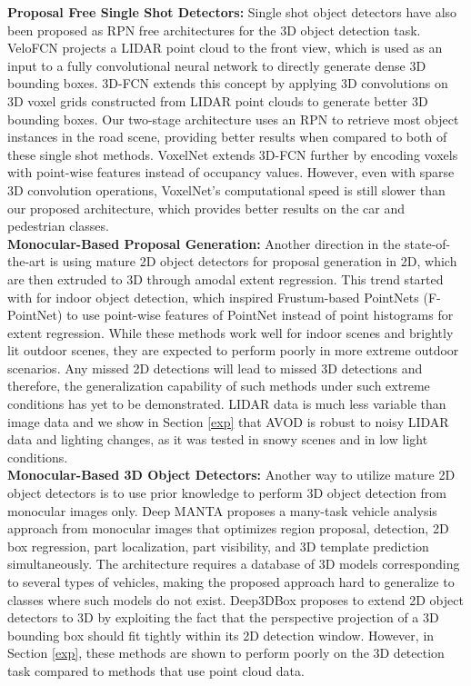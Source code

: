 \documentclass[letterpaper, 10 pt, conference]{ieeeconf}
\begin{document}
\noindent \textbf{Proposal Free Single Shot Detectors:}
Single shot object detectors have also been proposed as RPN free architectures for the 3D object detection task. VeloFCN \cite{Li-RSS-16} projects a LIDAR point cloud to the front view, which is used as an input to a fully convolutional neural network to directly generate dense 3D bounding boxes. 3D-FCN \cite{li20163d} extends this concept by applying 3D convolutions on 3D voxel grids constructed from LIDAR point clouds to generate better 3D bounding boxes. Our two-stage architecture uses an RPN to retrieve most object instances in the road scene, providing better results when compared to both of these single shot methods. VoxelNet \cite{zhou2017voxelnet} extends 3D-FCN further by encoding voxels with point-wise features instead of occupancy values. However, even with sparse 3D convolution operations, VoxelNet's computational speed is still  slower than our proposed architecture, which provides better results on the car and pedestrian classes.\\

\noindent \textbf{Monocular-Based Proposal Generation:}
Another direction in the state-of-the-art is using mature 2D object detectors for proposal generation in 2D, which are then extruded to 3D through amodal extent regression. This trend started with \cite{lahoud20172d} for indoor object detection, which inspired Frustum-based PointNets (F-PointNet) \cite{qi2017frustum} to use point-wise features of PointNet \cite{qi2016pointnet} instead of point histograms for extent regression. While these methods work well for indoor scenes and brightly lit outdoor scenes, they are expected to perform poorly in more extreme outdoor scenarios. Any missed 2D detections will lead to missed 3D detections and therefore, the generalization capability of such methods under such extreme conditions has yet to be demonstrated. LIDAR data is much less variable than image data and we show in Section \ref{exp} that AVOD is robust to noisy LIDAR data and lighting changes, as it was tested in snowy scenes and in low light conditions.\\

\noindent \textbf{Monocular-Based 3D Object Detectors:}
Another way to utilize mature 2D object detectors is to use prior knowledge to perform 3D object detection from monocular images only. Deep MANTA \cite{chabot2017deep} proposes a many-task vehicle analysis approach from monocular images that optimizes region proposal, detection, 2D box regression, part localization, part visibility, and 3D template prediction simultaneously. The architecture requires a database of 3D models corresponding to several types of vehicles, making the proposed approach hard to generalize to classes where such models do not exist. Deep3DBox \cite{mousavian20163d} proposes to extend 2D object detectors to 3D by exploiting the fact that the perspective projection of a 3D bounding box should fit tightly within its 2D detection window. However, in Section \ref{exp}, these methods are shown to perform poorly on the 3D detection task compared to methods that use point cloud data.\\
\end{document}
